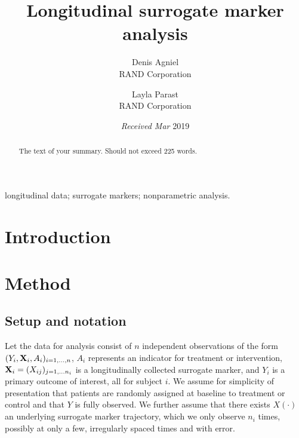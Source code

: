\documentclass[useAMS,usenatbib,referee]{biom}
\title[]{Longitudinal surrogate marker analysis}
\author{ Denis Agniel \email{\href{mailto:dagniel@rand.org}{\nolinkurl{dagniel@rand.org}}} \\ RAND Corporation  \and
		 Layla Parast \email{\href{mailto:parast@rand.org}{\nolinkurl{parast@rand.org}}} \\ RAND Corporation 
	   }
\begin{document}
\date{{\it Received Mar} 2019}

\pagerange{\pageref{firstpage}--\pageref{lastpage}} 



\label{firstpage}


\begin{abstract}
The text of your summary. Should not exceed 225 words.
\end{abstract}

%
%

\begin{keywords}
longitudinal data; surrogate markers; nonparametric analysis.
\end{keywords}

\maketitle

  \def\sone{^{(1)}} \def\szero{^{(0)}}

\section{Introduction}\label{intro}

\section{Method}\label{sec:1}

\subsection{Setup and notation}\label{setup-and-notation}

Let the data for analysis consist of \(n\) independent observations of
the form \((Y_i, {\bf X}_i, A_i)_{i=1, ..., n}\), \(A_i\) represents an
indicator for treatment or intervention,
\({\bf X}_i = (X_{ij})_{j=1, ... n_i}\) is a longitudinally collected
surrogate marker, and \(Y_i\) is a primary outcome of interest, all for
subject \(i\). We assume for simplicity of presentation that patients
are randomly assigned at baseline to treatment or control and that \(Y\)
is fully observed. We further assume that there exists \(X(\cdot)\) an
underlying surrogate marker trajectory, which we only observe \(n_i\)
times, possibly at only a few, irregularly spaced times and with error.
\end{document}
